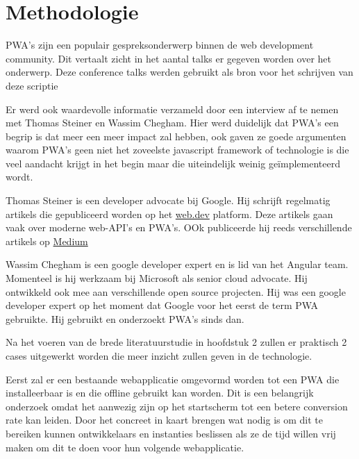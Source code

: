 
\chapter{Methodologie}
\label{ch:methodologie}



PWA's zijn een populair gespreksonderwerp binnen de web development community. Dit vertaalt zicht in het aantal talks er gegeven worden over het onderwerp. Deze conference talks werden gebruikt als bron voor het schrijven van deze scriptie

Er werd ook waardevolle informatie verzameld door een interview af te nemen met Thomas Steiner en Wassim Chegham. Hier werd duidelijk dat PWA's een begrip is dat meer een meer impact zal hebben, ook gaven ze goede argumenten waarom PWA's geen niet het zoveelste javascript framework of technologie is die veel aandacht krijgt in het begin maar die uiteindelijk weinig geïmplementeerd wordt.


Thomas Steiner is een developer advocate bij Google. Hij schrijft regelmatig artikels die gepubliceerd worden op het \href{https://web.dev/authors/thomassteiner/}{web.dev} platform. Deze artikels gaan vaak over moderne web-API's en PWA's. OOk publiceerde hij reeds verschillende artikels op \href{https://medium.com/@tomayac}{Medium}

Wassim Chegham is een google developer expert en is lid van het Angular team. Momenteel is hij werkzaam bij Microsoft als senior cloud advocate. Hij ontwikkeld ook mee aan verschillende open source projecten. Hij was een google developer expert op het moment dat Google voor het eerst de term PWA gebruikte. Hij gebruikt en onderzoekt PWA's sinds dan.

Na het voeren van de brede literatuurstudie in hoofdstuk 2 zullen er praktisch 2 cases uitgewerkt worden die meer inzicht zullen geven in de technologie.

Eerst zal er een bestaande webapplicatie omgevormd worden tot een PWA die installeerbaar is en die offline gebruikt kan worden. Dit is een belangrijk onderzoek omdat het aanwezig zijn op het startscherm tot een betere conversion rate kan leiden. Door het concreet in kaart brengen wat nodig is om dit te bereiken kunnen ontwikkelaars en instanties beslissen als ze de tijd willen vrij maken om dit te doen voor hun volgende webapplicatie.

